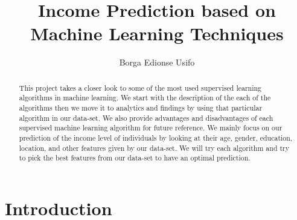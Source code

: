\documentclass[sigconf]{acmart}
\begin{document}
\title{Income Prediction based on Machine Learning Techniques}

\author{Borga Edionse Usifo}

\renewcommand{\shortauthors}{B. Usifo et al.}

\begin{abstract}
This project takes a closer look to some of the most used supervised learning algorithms in machine learning. We start with the description of the each of the algorithms then we move it to analytics and findings by using that particular algorithm in our data-set. We also provide advantages and disadvantages of each supervised machine learning algorithm for future reference. We mainly focus on our prediction of the income level of individuals by looking at their age, gender, education, location, and other features given by our data-set. We will try each algorithm and try to pick the best features from our data-set to have an optimal prediction.
\end{abstract}


\maketitle

\section{Introduction}
\end{document}
